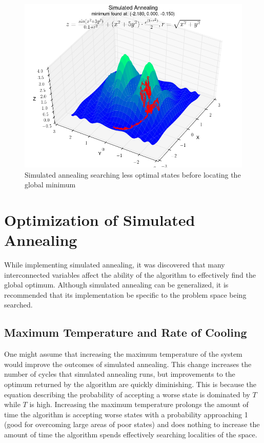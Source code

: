 \documentclass[10pt,a4paper,titlepage]{article}
\begin{document}
\begin{figure}[!ht]
  \centering
    \includegraphics[width=\textwidth]{annealing_1.png}
    \caption{Simulated annealing searching less optimal states before locating the global minimum}
\end{figure}

\newpage
\section{Optimization of Simulated Annealing}
While implementing simulated annealing, it was discovered that many interconnected variables affect the ability of the algorithm to effectively find the global optimum.  Although simulated annealing can be generalized, it is recommended that its implementation be specific to the problem space being searched.

\subsection*{Maximum Temperature and Rate of Cooling}
One might assume that increasing the maximum temperature of the system would improve the outcomes of simulated annealing.  This change increases the number of cycles that simulated annealing runs, but improvements to the optimum returned by the algorithm are quickly diminishing.  This is because the equation describing the probability of accepting a worse state is dominated by $T$ while $T$ is high.  Increasing the maximum temperature prolongs the amount of time the algorithm is accepting worse states with a probability approaching 1 (good for overcoming large areas of poor states) and does nothing to increase the amount of time the algorithm spends effectively searching localities of the space.
\end{document}
